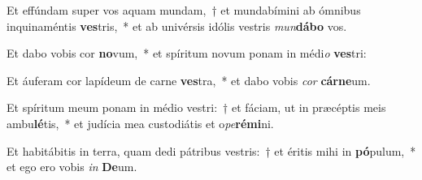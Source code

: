 \item Et effúndam super vos aquam mundam,~† et mundabímini ab ómnibus inquinaméntis \textbf{ves}tris,~* et ab univérsis idólis vestris \textit{mun}\textbf{dá}\textbf{bo} vos.
\item Et dabo vobis cor \textbf{no}vum,~* et spíritum novum ponam in médi\textit{o} \textbf{ves}tri:
\item Et áuferam cor lapídeum de carne \textbf{ves}tra,~* et dabo vobis \textit{cor} \textbf{cár}\textbf{ne}um.
\item Et spíritum meum ponam in médio vestri:~† et fáciam, ut in præcéptis meis ambu\textbf{lé}tis,~* et judícia mea custodiátis et o\textit{pe}\textbf{ré}\textbf{mi}ni.
\item Et habitábitis in terra, quam dedi pátribus vestris:~† et éritis mihi in \textbf{pó}pulum,~* et ego ero vobis \textit{in} \textbf{De}um.
